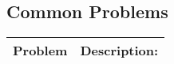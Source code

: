 \subsection{Common Problems}
\begin{summary}
    \begin{center}
        \begin{tabular}{ll}
            \toprule
            \textbf{Problem} & \textbf{Description:} \\
            \midrule

\end{tabular}
\end{center}
\end{summary}
